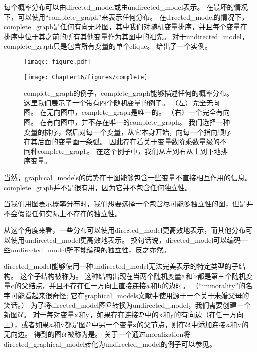 每个概率分布可以由\gls{directed_model}或由\gls{undirected_model}表示。
在最坏的情况下，可以使用``\gls{complete_graph}''来表示任何分布。
在\gls{directed_model}的情况下，\gls{complete_graph}是任何有向无环图，其中我们对随机变量排序，并且每个变量在排序中位于其之前的所有其他变量作为其图中的祖先。
对于\gls{undirected_model}，\gls{complete_graph}只是包含所有变量的单个\gls{clique}。 
给出了一个实例。

\begin{figure}[!htb]
\ifOpenSource
\centerline{\texttt{[image: figure.pdf]}}
\else
	\centerline{\texttt{[image: Chapter16/figures/complete]}}	
\fi
\caption{\gls{complete_graph}的例子，\gls{complete_graph}能够描述任何的概率分布。
这里我们展示了一个带有四个随机变量的例子。
（左）完全无向图。
在无向图中，\gls{complete_graph}是唯一的。
（右）一个完全有向图。
在有向图中，并不存在唯一的\gls{complete_graph}。
我们选择一种变量的排序，然后对每一个变量，从它本身开始，向每一个指向顺序在其后面的变量画一条弧。
因此存在着关于变量数阶乘数量级的不同种\gls{complete_graph}。
在这个例子中，我们从左到右从上到下地排序变量。}
	\label{fig:complete}
\end{figure}


当然，\gls{graphical_models}的优势在于图能够包含一些变量不直接相互作用的信息。 
\gls{complete_graph}并不是很有用，因为它并不包含任何独立性。


当我们用图表示概率分布时，我们想要选择一个包含尽可能多独立性的图，但是并不会假设任何实际上不存在的独立性。


从这个角度来看，一些分布可以使用\gls{directed_model}更高效地表示，而其他分布可以使用\gls{undirected_model}更高效地表示。
换句话说，\gls{directed_model}可以编码一些\gls{undirected_model}所不能编码的独立性，反之亦然。


\gls{directed_model}能够使用一种\gls{undirected_model}无法完美表示的特定类型的子结构。
这个子结构被称为。
这种结构出现在当两个随机变量$\mathrm{a}$和$\mathrm{b}$都是第三个随机变量$\mathrm{c}$的父结点，并且不存在任一方向上直接连接$\mathrm{a}$和$\mathrm{b}$的边时。
（``\gls{immorality}''的名字可能看起来很奇怪; 它在\gls{graphical_models}文献中使用源于一个关于未婚父母的笑话。）
为了将\gls{directed_model}图$\mathcal{D}$转换为\gls{undirected_model}，我们需要创建一个新图$\mathcal{U}$。
对于每对变量$\mathrm{x}$和$\mathrm{y}$，如果存在连接$\mathcal{D}$中的$\mathrm{x}$和$\mathrm{y}$的有向边（在任一方向上），或者如果$\mathrm{x}$和$\mathrm{y}$都是图$\mathcal{D}$中另一个变量$\mathrm{z}$的父节点，则在$\mathcal{U}$中添加连接$\mathrm{x}$和$\mathrm{y}$的无向边。 
得到的图$\mathcal{U}$被称为是。
关于一个通过\gls{moralization}将\gls{directed_graphical_model}转化为\gls{undirected_model}的例子可以参见。


